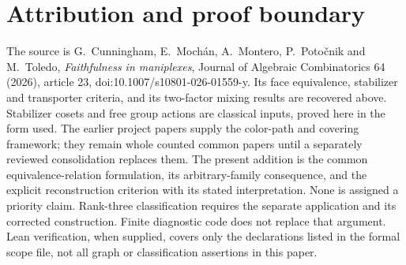 \documentclass[a4paper,11pt]{article}
\begin{document}
\section{Attribution and proof boundary}
The source is G.~Cunningham, E.~Moch\'an, A.~Montero, P.~Poto\v cnik
and M.~Toledo, \emph{Faithfulness in maniplexes}, Journal of Algebraic
Combinatorics 64 (2026), article 23,
doi:10.1007/s10801-026-01559-y. Its face equivalence, stabilizer and
transporter criteria, and its two-factor mixing results are recovered
above. Stabilizer cosets and free group actions are classical inputs,
proved here in the form used. The earlier project papers supply the
color-path and covering framework; they remain whole counted common
papers until a separately reviewed consolidation replaces them.
The present addition is the common equivalence-relation formulation,
its arbitrary-family consequence, and the explicit reconstruction
criterion with its stated interpretation. None is assigned a priority
claim. Rank-three classification requires the separate application
and its corrected construction. Finite diagnostic code does not
replace that argument. Lean verification, when supplied, covers only
the declarations listed in the formal scope file, not all graph or
classification assertions in this paper.
\end{document}

